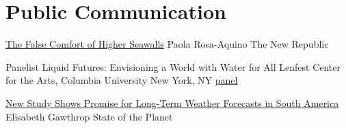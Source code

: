 \section{Public Communication}

{\href{https://newrepublic.com/article/155519/false-comfort-higher-seawalls}
	{The False Comfort of Higher Seawalls}}
{Paola Rosa-Aquino}
{The New Republic}
{}
{}

{Panelist}
{Liquid Futures: Envisioning a World with Water for All}
{Lenfest Center for the Arts, Columbia University}
{New York, NY}
{\href{https://lenfest.arts.columbia.edu/events/liquid-futures-envisioning-world-water-all-fall-2019}{panel}}
{}

{\href{https://blogs.ei.columbia.edu/2018/08/06/subseasonal-weather-forecasts-paraguay/}
	{New Study Shows Promise for Long-Term Weather Forecasts in South America}}
{Elisabeth Gawthrop}
{State of the Planet}
{}
{}
